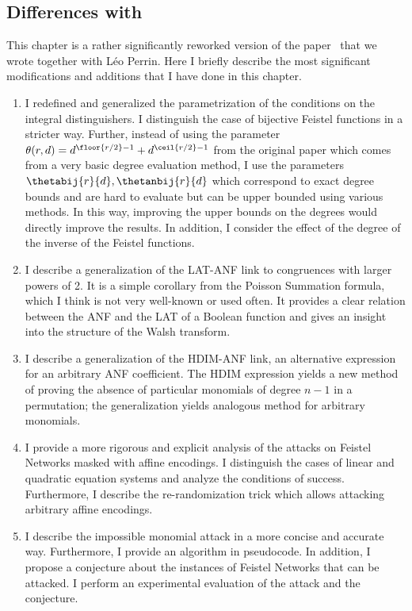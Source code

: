 \subsection{Differences with~\cite{OurFeistel}}
This chapter is a rather significantly reworked version of the paper~\cite{OurFeistel} that we wrote together with Léo Perrin. Here I briefly describe the most significant modifications and additions that I have done in this chapter.
\begin{enumerate}
    \item I redefined and generalized the parametrization of the conditions on the integral distinguishers. I distinguish the case of bijective Feistel functions in a stricter way. Further, instead of using the parameter $\theta(r,d)=d^{\floor{r/2}-1} + d^{\ceil{r/2}-1}$ from the original paper which comes from a very basic degree evaluation method, I use the parameters $\thetabij{r}{d},\thetanbij{r}{d}$ which correspond to exact degree bounds and are hard to evaluate but can be upper bounded using various methods. In this way, improving the upper bounds on the degrees would directly improve the results. In addition, I consider the effect of the degree of the inverse of the Feistel functions.
    
    \item I describe a generalization of the LAT-ANF link to congruences with larger powers of 2. It is a simple corollary from the Poisson Summation formula, which I think is not very well-known or used often. It provides a clear relation between the ANF and the LAT of a Boolean function and gives an insight into the structure of the Walsh transform. 
    
    \item I describe a generalization of the HDIM-ANF link, an alternative expression for an arbitrary ANF coefficient. The HDIM expression yields a new method of proving the absence of particular monomials of degree $n-1$ in a permutation; the generalization yields analogous method for arbitrary monomials.
    
    \item I provide a more rigorous and explicit analysis of the attacks on Feistel Networks masked with affine encodings. I distinguish the cases of linear and quadratic equation systems and analyze the conditions of success. Furthermore, I describe the re-randomization trick which allows attacking arbitrary affine encodings.
    
    \item I describe the impossible monomial attack in a more concise and accurate way. Furthermore, I provide an algorithm in pseudocode. In addition, I propose a conjecture about the instances of Feistel Networks that can be attacked. I perform an experimental evaluation of the attack and the conjecture.
\end{enumerate}

